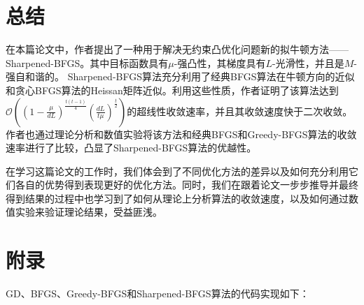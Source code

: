 \documentclass[a4paper,twoside,AutoFakeBold]{article}
\theoremstyle{definition}
\begin{document}
\section{总结}\label{section:conclusion}
在本篇论文中，作者提出了一种用于解决无约束凸优化问题新的拟牛顿方法——Sharpened-BFGS。其中目标函数具有$\mu$-强凸性，其梯度具有$L$-光滑性，并且是$M$-强自和谐的。
Sharpened-BFGS算法充分利用了经典BFGS算法在牛顿方向的近似和贪心BFGS算法的Heissan矩阵近似。利用这些性质，作者证明了该算法达到$\mathcal{O}((1 - \frac{\mu}{dL})^{\frac{t(t - 1)}{4}} (\frac{dL}{t\mu})^{\frac{t}{2}})$的超线性收敛速率，并且其收敛速度快于二次收敛。
作者也通过理论分析和数值实验将该方法和经典BFGS和Greedy-BFGS算法的收敛速率进行了比较，凸显了Sharpened-BFGS算法的优越性。

在学习这篇论文的工作时，我们体会到了不同优化方法的差异以及如何充分利用它们各自的优势得到表现更好的优化方法。同时，我们在跟着论文一步步推导并最终得到结果的过程中也学习到了如何从理论上分析算法的收敛速度，以及如何通过数值实验来验证理论结果，受益匪浅。

%
\newpage
\section{附录}\label{section:appendix}

GD、BFGS、Greedy-BFGS和Sharpened-BFGS算法的代码实现如下：
\inputminted{python}{./code/main.py}



\end{document}
